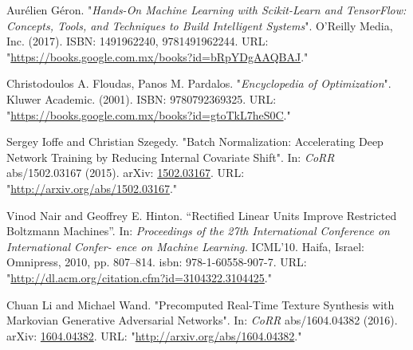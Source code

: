 \begin{thebibliography}{100}
Aurélien Géron. "\textit{Hands-On Machine Learning with Scikit-Learn and TensorFlow: Concepts, Tools, and Techniques to Build Intelligent Systems}". O'Reilly Media, Inc.
(2017). ISBN: 1491962240, 9781491962244. URL: "\url{https://books.google.com.mx/books?id=bRpYDgAAQBAJ}."

Christodoulos A. Floudas, Panos M. Pardalos. "\textit{Encyclopedia of Optimization}". Kluwer Academic.
(2001). ISBN: 9780792369325. URL: "\url{https://books.google.com.mx/books?id=gtoTkL7heS0C}."

Sergey Ioffe and Christian Szegedy. "{Batch Normalization: Accelerating Deep Network Training by Reducing Internal Covariate Shift}".
In: \textit{CoRR} abs/1502.03167
(2015). arXiv: \href{http://arxiv.org/abs/1502.03167}{1502.03167}. URL: "\url{http://arxiv.org/abs/1502.03167}."

Vinod Nair and Geoffrey E. Hinton. “Rectified Linear Units Improve Restricted Boltzmann Machines”. In: \textit{Proceedings of the 27th International Conference on International Confer- ence on Machine Learning.} ICML’10. Haifa, Israel: Omnipress, 2010, pp. 807–814. isbn: 978-1-60558-907-7. URL: "\url{http://dl.acm.org/citation.cfm?id=3104322.3104425}."

Chuan Li and Michael Wand. "{Precomputed Real-Time Texture Synthesis with Markovian Generative Adversarial Networks}".
In: \textit{CoRR} abs/1604.04382
(2016). arXiv: \href{http://arxiv.org/abs/1604.04382}{1604.04382}. URL: "\url{http://arxiv.org/abs/1604.04382}."


\end{thebibliography}
